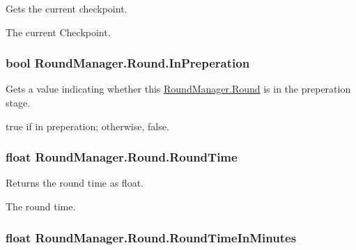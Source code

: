 Gets the current checkpoint. 

The current Checkpoint.\hypertarget{class_round_manager_1_1_round_a1b6e615e3cde6ad8b16de057f63deea9}{}
\subsubsection[{In\+Preperation}]{\setlength{\rightskip}{0pt plus 5cm}bool Round\+Manager.\+Round.\+In\+Preperation\hspace{0.3cm}{\ttfamily [get]}}\label{class_round_manager_1_1_round_a1b6e615e3cde6ad8b16de057f63deea9}


Gets a value indicating whether this \hyperlink{class_round_manager_1_1_round}{Round\+Manager.\+Round} is in the preperation stage. 

{\ttfamily true} if in preperation; otherwise, {\ttfamily false}.\hypertarget{class_round_manager_1_1_round_ae62fa1d669d9e997810330a075c8f313}{}
\subsubsection[{Round\+Time}]{\setlength{\rightskip}{0pt plus 5cm}float Round\+Manager.\+Round.\+Round\+Time\hspace{0.3cm}{\ttfamily [get]}}\label{class_round_manager_1_1_round_ae62fa1d669d9e997810330a075c8f313}


Returns the round time as float. 

The round time.\hypertarget{class_round_manager_1_1_round_ad234c1b6503c0b204a63354860652fed}{}
\subsubsection[{Round\+Time\+In\+Minutes}]{\setlength{\rightskip}{0pt plus 5cm}float Round\+Manager.\+Round.\+Round\+Time\+In\+Minutes\hspace{0.3cm}{\ttfamily [get]}}\label{class_round_manager_1_1_round_ad234c1b6503c0b204a63354860652fed}


